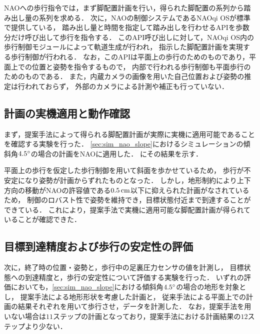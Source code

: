 \documentclass[autodetect-engine,dvipdfmx-if-dvi,ja=standard,a4j,jbase=11pt,magstyle=nomag*]{bxjsreport}
\begin{document}
NAOへの歩行指令では，まず脚配置計画を行い，得られた脚配置の系列から踏み出し量の系列を求める．
次に，NAOの制御システムであるNAOqi OSが標準で提供している，
踏み出し量と時間を指定して踏み出しを行わせるAPIを歩数分だけ呼び出して歩行を指令する．
このAPI呼び出しに対して，NAOqi OS内の歩行制御モジュールによって軌道生成が行われ，
指示した脚配置計画を実現する歩行制御が行われる．
なお，このAPIは平面上の歩行のためのものであり，平面上での位置と姿勢を指令するもので，
内部で行われる歩行制御も平面歩行のためのものである．
また，内蔵カメラの画像を用いた自己位置および姿勢の推定は行われておらず，
外部のカメラによる計測や補正も行っていない．


\subsection{計画の実機適用と動作確認}
まず，提案手法によって得られる脚配置計画が実際に実機に適用可能であることを確認する実験を行った．
\cref{sec:sim_nao_slope}におけるシミュレーションの傾斜角$4.5\degree$の場合の計画をNAOに適用した．
にその結果を示す．


平面上の歩行を仮定した歩行制御を用いて斜面を歩かせているため，
歩行が不安定になり姿勢が計画からずれたものとなった．
しかし，地形制約により上下方向の移動がNAOの許容値である$0.5\,\si{\centi\meter}$以下に抑えられた計画がなされているため，
制御のロバスト性で姿勢を維持でき，目標状態付近まで到達することができている．
これにより，提案手法で実機に適用可能な脚配置計画が得られていることが確認できた．


\subsection{目標到達精度および歩行の安定性の評価}
次に，終了時の位置・姿勢と，歩行中の足裏圧力センサの値を計測し，
目標状態への到達精度と，歩行の安定性について評価する実験を行った．
いずれの評価においても，\cref{sec:sim_nao_slope}における傾斜角$4.5\degree$の場合の地形を対象とし，
提案手法による地形形状を考慮した計画と，
従来手法による平面上での計画の結果それぞれを用いて歩行させ，データを計測した．
なお，提案手法を用いない場合は$11$ステップの計画となっており，提案手法における計画結果の$12$ステップより少ない．
\end{document}
